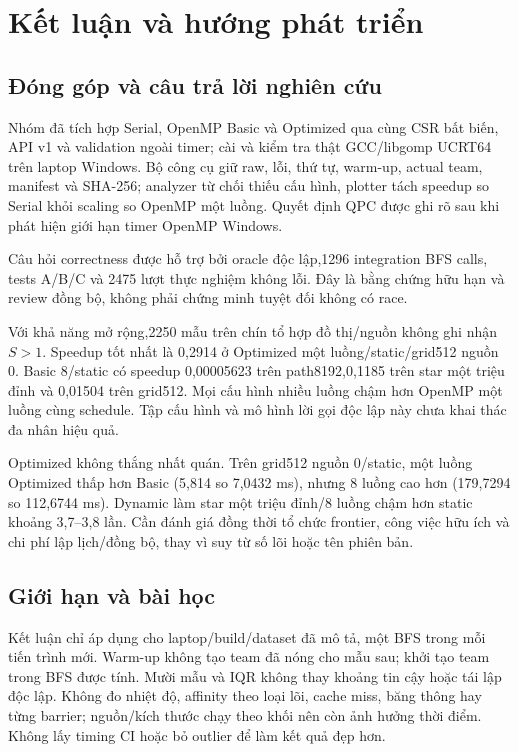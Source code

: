 \chapter{Kết luận và hướng phát triển}
\section{Đóng góp và câu trả lời nghiên cứu}
Nhóm đã tích hợp Serial, OpenMP Basic và Optimized qua cùng CSR bất biến, API v1 và validation ngoài timer; cài và kiểm tra thật GCC/libgomp UCRT64 trên laptop Windows. Bộ công cụ giữ raw, lỗi, thứ tự, warm-up, actual team, manifest và SHA-256; analyzer từ chối thiếu cấu hình, plotter tách speedup so Serial khỏi scaling so OpenMP một luồng. Quyết định QPC được ghi rõ sau khi phát hiện giới hạn timer OpenMP Windows.

Câu hỏi correctness được hỗ trợ bởi oracle độc lập,1296 integration BFS calls, tests A/B/C và 2475 lượt thực nghiệm không lỗi. Đây là bằng chứng hữu hạn và review đồng bộ, không phải chứng minh tuyệt đối không có race.

Với khả năng mở rộng,2250 mẫu trên chín tổ hợp đồ thị/nguồn không ghi nhận $S>1$. Speedup tốt nhất là 0,2914 ở Optimized một luồng/static/grid512 nguồn 0. Basic 8/static có speedup 0,00005623 trên path8192,0,1185 trên star một triệu đỉnh và 0,01504 trên grid512. Mọi cấu hình nhiều luồng chậm hơn OpenMP một luồng cùng schedule. Tập cấu hình và mô hình lời gọi độc lập này chưa khai thác đa nhân hiệu quả.

Optimized không thắng nhất quán. Trên grid512 nguồn 0/static, một luồng Optimized thấp hơn Basic (5,814 so 7,0432 ms), nhưng 8 luồng cao hơn (179,7294 so 112,6744 ms). Dynamic làm star một triệu đỉnh/8 luồng chậm hơn static khoảng 3,7--3,8 lần. Cần đánh giá đồng thời tổ chức frontier, công việc hữu ích và chi phí lập lịch/đồng bộ, thay vì suy từ số lõi hoặc tên phiên bản.

\section{Giới hạn và bài học}
Kết luận chỉ áp dụng cho laptop/build/dataset đã mô tả, một BFS trong mỗi tiến trình mới. Warm-up không tạo team đã nóng cho mẫu sau; khởi tạo team trong BFS được tính. Mười mẫu và IQR không thay khoảng tin cậy hoặc tái lập độc lập. Không đo nhiệt độ, affinity theo loại lõi, cache miss, băng thông hay từng barrier; nguồn/kích thước chạy theo khối nên còn ảnh hưởng thời điểm. Không lấy timing CI hoặc bỏ outlier để làm kết quả đẹp hơn.

